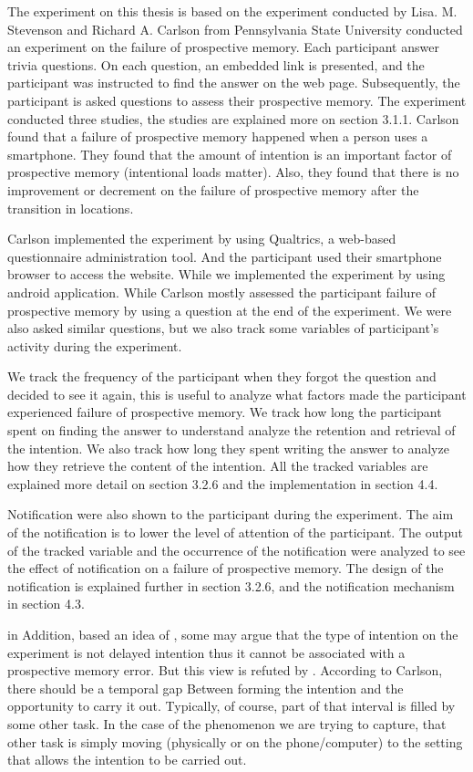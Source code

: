 The experiment on this thesis is based on the experiment conducted by Lisa. M. Stevenson and Richard A. Carlson from Pennsylvania State University conducted an
experiment on the failure of prospective memory.
Each participant answer trivia questions.
 On each question, an embedded link is presented, and the participant was instructed to find the answer on the web page.
 Subsequently, the participant is asked questions to assess their prospective memory.
The experiment conducted three studies, the studies are explained more on section 3.1.1.
Carlson found that a failure of prospective memory happened when a person uses a smartphone.
They found that the amount of intention is an important factor of prospective memory (intentional loads matter).
Also, they found that there is no improvement or decrement on the failure of prospective memory after the transition in locations.

Carlson implemented the experiment by using Qualtrics, a web-based questionnaire administration tool. And the participant
used their smartphone browser to access the website. While we implemented the experiment by using android application.
While Carlson mostly assessed the participant failure of prospective memory by using a question at the end of the experiment. We were also
asked similar questions, but we also track some variables of participant's activity during the experiment.

We track the frequency of the participant when they forgot the question and decided to see it again, this is useful to analyze what factors made the participant experienced
failure of prospective memory. We track how long the participant spent on finding the answer to understand analyze the retention and retrieval of the intention.
We also track how long they spent writing the answer to analyze how they retrieve the content of the intention. All the tracked variables are explained
more detail on section 3.2.6 and the implementation in section 4.4.

Notification were also shown to the participant during the experiment. The aim of the notification
is to lower the level of attention of the participant. The output of the tracked variable and the occurrence of the notification
were analyzed to see the effect of notification on a failure of prospective memory. The design of the notification is explained further in section 3.2.6, and
the notification mechanism in section 4.3.

in Addition, based an idea of \cite{inside1996prospective}, some may argue that the type of intention on the experiment is not delayed intention
thus it cannot be associated with a prospective memory error. But this view is
refuted by \cite{10.1371/journal.pone.0074447}. According to Carlson, there should be a temporal gap
Between forming the intention and the opportunity to carry it out. Typically, of course, part of that interval is filled by some other task.
In the case of the phenomenon we are trying to capture, that other task is simply moving (physically or on the phone/computer) to the setting that allows the intention to be carried out.
